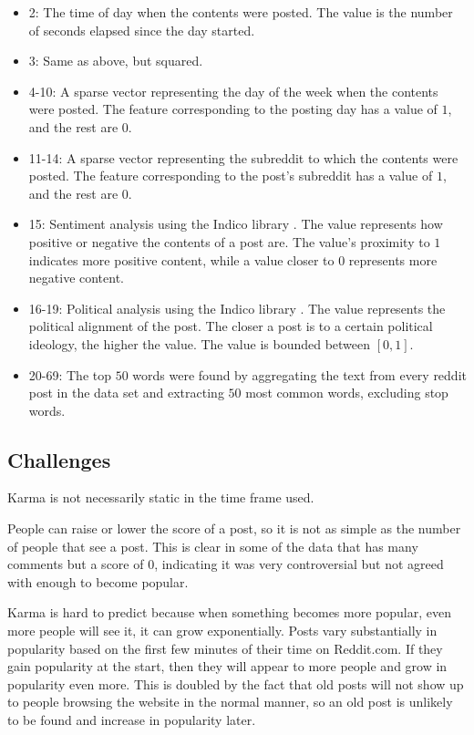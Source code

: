 \documentclass[10pt,twocolumn]{article}
\begin{document}
\begin{itemize}
    \item 2:
        The time of day when the contents were posted.
        The value is the number of seconds elapsed since the day started.
    \item 3:
        Same as above, but squared.
	\item 4-10:
		A sparse vector representing the day of the week when the contents were posted.
		The feature corresponding to the posting day has a value of $1$, and the rest are $0$.
	\item 11-14:
		A sparse vector representing the subreddit to which the contents were posted.
		The feature corresponding to the post's subreddit has a value of $1$, and the rest are $0$.
	\item 15:
		Sentiment analysis using the Indico library \cite{indico}.
		The value represents how positive or negative the contents of a post are.
		The value's proximity to $1$ indicates more positive content, while a value closer to $0$ represents more negative content.
	\item 16-19: 
		Political analysis using the Indico library \cite{indico}.
		The value represents the political alignment of the post.
		The closer a post is to a certain political ideology, the higher the value.
		The value is bounded between $[0,1]$.
	\item 20-69:
		The top $50$ words were found by aggregating the text from every reddit post in the data set and extracting $50$ most common words, excluding stop words.
\end{itemize}

\subsection{Challenges}
Karma is not necessarily static in the time frame used.

People can raise or lower the score of a post, so it is not as simple as the number of people that see a post. This is clear in some of the data that has many comments but a score of 0, indicating it was very controversial but not agreed with enough to become popular.

Karma is hard to predict because when something becomes more popular, even more people will see it, it can grow exponentially. Posts vary substantially in popularity based on the first few minutes of their time on Reddit.com. If they gain popularity at the start, then they will appear to more people and grow in popularity even more. This is doubled by the fact that old posts will not show up to people browsing the website in the normal manner, so an old post is unlikely to be found and increase in popularity later.
\end{document}
